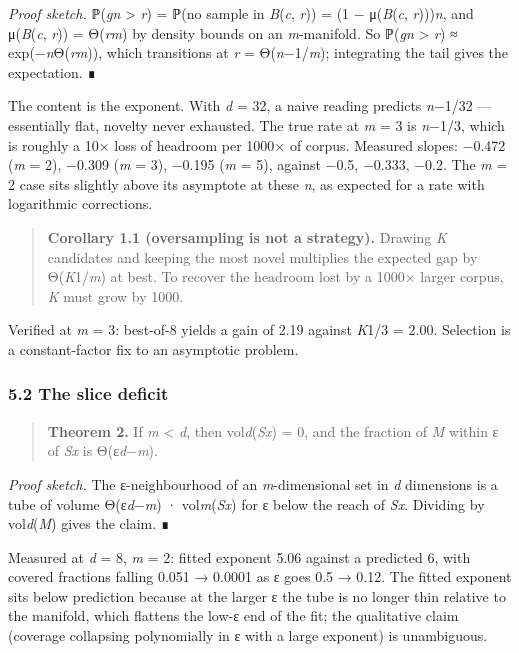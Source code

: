 \documentclass[
  10pt,
]{article}
\theoremstyle{plain}
\theoremstyle{definition}
\begin{document}
\emph{Proof sketch.} ℙ(\emph{gn} \textgreater{} \emph{r}) = ℙ(no sample
in \emph{B}(\emph{c}, \emph{r})) = (1 − μ(\emph{B}(\emph{c},
\emph{r})))\emph{n}, and μ(\emph{B}(\emph{c}, \emph{r})) =
Θ(\emph{r}\emph{m}) by density bounds on an \emph{m}-manifold. So
ℙ(\emph{gn} \textgreater{} \emph{r}) ≈ exp(−\emph{n}Θ(\emph{rm})), which
transitions at \emph{r} = Θ(\emph{n}−1/\emph{m}); integrating the tail
gives the expectation. ∎

The content is the exponent. With \emph{d} = 32, a naive reading
predicts \emph{n}−1/32 --- essentially flat, novelty never exhausted.
The true rate at \emph{m} = 3 is \emph{n}−1/3, which is roughly a 10×
loss of headroom per 1000× of corpus. Measured slopes: −0.472 (\emph{m}
= 2), −0.309 (\emph{m} = 3), −0.195 (\emph{m} = 5), against −0.5,
−0.333, −0.2. The \emph{m} = 2 case sits slightly above its asymptote at
these \emph{n}, as expected for a rate with logarithmic corrections.

\begin{quote}
\textbf{Corollary 1.1 (oversampling is not a strategy).} Drawing
\emph{K} candidates and keeping the most novel multiplies the expected
gap by Θ(\emph{K}1/\emph{m}) at best. To recover the headroom lost by a
1000× larger corpus, \emph{K} must grow by 1000.
\end{quote}

Verified at \emph{m} = 3: best-of-8 yields a gain of 2.19 against
\emph{K}1/3 = 2.00. Selection is a constant-factor fix to an asymptotic
problem.

\subsubsection{5.2 The slice deficit}\label{52-the-slice-deficit}

\begin{quote}
\textbf{Theorem 2.} If \emph{m} \textless{} \emph{d}, then
vol\emph{d}(\emph{Sx}) = 0, and the fraction of \emph{M} within ε of
\emph{Sx} is Θ(ε\emph{d}−\emph{m}).
\end{quote}

\emph{Proof sketch.} The ε-neighbourhood of an \emph{m}-dimensional set
in \emph{d} dimensions is a tube of volume Θ(ε\emph{d}−\emph{m}) ·
vol\emph{m}(\emph{Sx}) for ε below the reach of \emph{Sx}. Dividing by
vol\emph{d}(\emph{M}) gives the claim. ∎

Measured at \emph{d} = 8, \emph{m} = 2: fitted exponent 5.06 against a
predicted 6, with covered fractions falling 0.051 → 0.0001 as ε goes 0.5
→ 0.12. The fitted exponent sits below prediction because at the larger
ε the tube is no longer thin relative to the manifold, which flattens
the low-ε end of the fit; the qualitative claim (coverage collapsing
polynomially in ε with a large exponent) is unambiguous.
\end{document}

